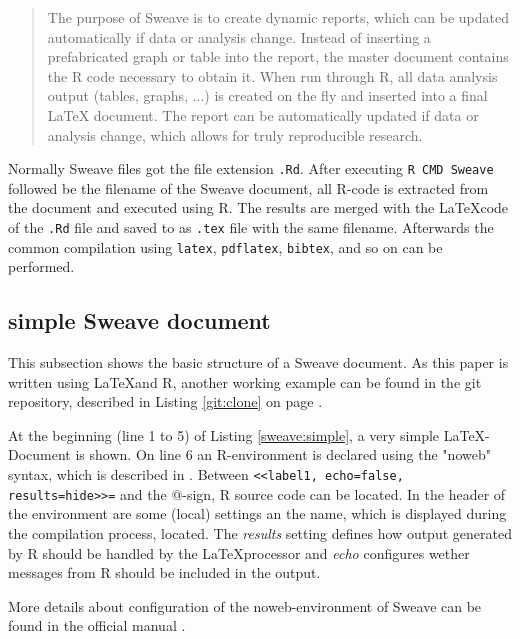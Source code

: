 \documentclass{ifacconf}
\begin{document}
\begin{quotation}
The purpose of Sweave is to create dynamic reports, 
which can be updated automatically if data or
analysis change. Instead of inserting a prefabricated
graph or table into the report, the master document
contains the R code necessary to obtain it. When run
through R, all data analysis output (tables, graphs, ...) 
is created on the fly and inserted into a final \LaTeX
document. The report can be automatically updated
if data or analysis change, which allows for truly reproducible research.
\end{quotation}

Normally Sweave files got the file extension \texttt{.Rd}. 
After executing \texttt{R CMD Sweave} followed be the filename
of the Sweave document, all R-code is extracted from the document and executed using R.
The results are merged with the \LaTeX code of the \texttt{.Rd} file and saved
to as \texttt{.tex} file with the same filename. Afterwards the common 
compilation using \texttt{latex}, \texttt{pdflatex}, \texttt{bibtex}, and so on
can be performed.

\subsection{simple Sweave document}

This subsection shows the basic structure of a Sweave document. As this
paper is written using \LaTeX and R, another working example can be found
in the git repository, described in Listing \ref{git:clone} on page
\pageref{git:clone}.

At the beginning (line 1 to 5) of Listing \ref{sweave:simple}, a very simple
\LaTeX-Document is shown. On line 6 an R-environment is declared using 
the "noweb" syntax, which is described in \cite{Ramsey_1994, Johnson_Johnson_2000}.
Between \newline \texttt{<<label1, echo=false, results=hide>>=} \newline and the
@-sign, R source code can be located. In the header of the environment are
some (local) settings an the name, which is displayed during the
compilation process, located. The \textit{results} setting defines how
output generated by R should be handled by the \LaTeX processor and \textit{echo}
configures wether messages from R should be included in the output.

More details about configuration of the noweb-environment of Sweave can
be found in the official manual \citep{SweaveManual}.
\end{document}
